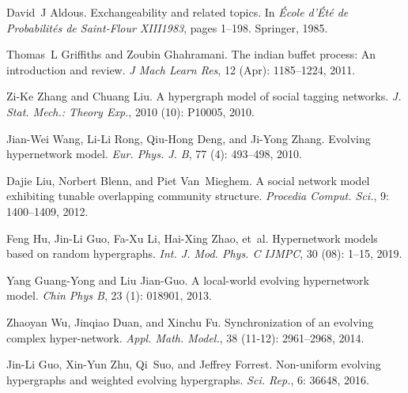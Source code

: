 David~J Aldous.
\newblock Exchangeability and related topics.
\newblock In \emph{{\'E}cole d'{{{\'E}t{\'e}}} de Probabilit{\'e}s de
    Saint-Flour {{XIII}}\textemdash{}1983}, pages 1--198. {Springer}, 1985.

Thomas~L Griffiths and Zoubin Ghahramani.
\newblock The indian buffet process: {{An}} introduction and review.
\newblock \emph{J Mach Learn Res}, 12 (Apr): 1185--1224,
2011.

Zi-Ke Zhang and Chuang Liu.
\newblock A hypergraph model of social tagging networks.
\newblock \emph{J. Stat. Mech.: Theory Exp.}, 2010 (10):
P10005, 2010.

Jian-Wei Wang, Li-Li Rong, Qiu-Hong Deng, and Ji-Yong Zhang.
\newblock Evolving hypernetwork model.
\newblock \emph{Eur. Phys. J. B}, 77 (4): 493--498, 2010.

Dajie Liu, Norbert Blenn, and Piet Van~Mieghem.
\newblock A social network model exhibiting tunable overlapping community
structure.
\newblock \emph{Procedia Comput. Sci.}, 9: 1400--1409, 2012.

Feng Hu, Jin-Li Guo, Fa-Xu Li, Hai-Xing Zhao, et~al.
\newblock Hypernetwork models based on random hypergraphs.
\newblock \emph{Int. J. Mod. Phys. C IJMPC}, 30 (08): 1--15,
2019.

Yang {Guang-Yong} and Liu {Jian-Guo}.
\newblock A local-world evolving hypernetwork model.
\newblock \emph{Chin Phys B}, 23 (1): 018901, 2013.

Zhaoyan Wu, Jinqiao Duan, and Xinchu Fu.
\newblock Synchronization of an evolving complex hyper-network.
\newblock \emph{Appl. Math. Model.}, 38 (11-12): 2961--2968,
2014.

Jin-Li Guo, Xin-Yun Zhu, Qi~Suo, and Jeffrey Forrest.
\newblock Non-uniform evolving hypergraphs and weighted evolving hypergraphs.
\newblock \emph{Sci. Rep.}, 6: 36648, 2016.

